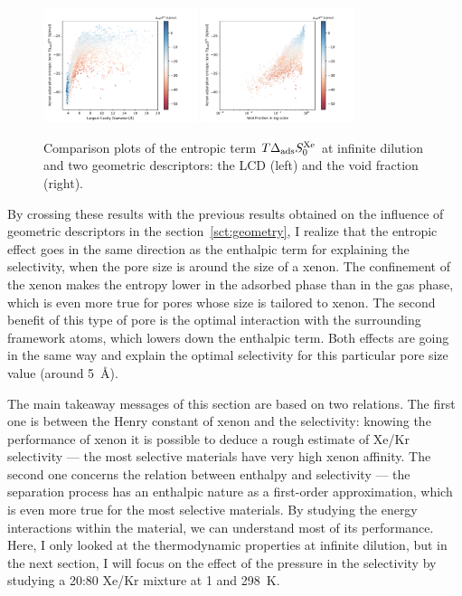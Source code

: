 \documentclass[main.tex]{subfiles}
\begin{document}
\begin{figure}
  \centering
  \includegraphics[width=0.4\textwidth]{figures/2-thermo/Scatterplot_entropy_lcd.pdf}
  \includegraphics[width=0.4\textwidth]{figures/2-thermo/Scatterplot_entropy_vf.pdf}
  \caption{Comparison plots of the entropic term $T\Delta_{\text{ads}}S^{\text{Xe}}_{\text{0}}$ at infinite dilution and two geometric descriptors: the LCD (left) and the void fraction (right).}\label{fgr:entropy_geometry}
\end{figure}

By crossing these results with the previous results obtained on the influence of geometric descriptors in the section~\ref{sct:geometry}, I realize that the entropic effect goes in the same direction as the enthalpic term for explaining the selectivity, when the pore size is around the size of a xenon. The confinement of the xenon makes the entropy lower in the adsorbed phase than in the gas phase, which is even more true for pores whose size is tailored to xenon. The second benefit of this type of pore is the optimal interaction with the surrounding framework atoms, which lowers down the enthalpic term. Both effects are going in the same way and explain the optimal selectivity for this particular pore size value (around \SI{5}{\angstrom}). 

The main takeaway messages of this section are based on two relations. The first one is between the Henry constant of xenon and the selectivity: knowing the performance of xenon it is possible to deduce a rough estimate of Xe/Kr selectivity --- the most selective materials have very high xenon affinity. The second one concerns the relation between enthalpy and selectivity --- the separation process has an enthalpic nature as a first-order approximation, which is even more true for the most selective materials. By studying the energy interactions within the material, we can understand most of its performance. Here, I only looked at the thermodynamic properties at infinite dilution, but in the next section, I will focus on the effect of the pressure in the selectivity by studying a 20:80 Xe/Kr mixture at \SI{1}{\atm} and \SI{298}{\kelvin}. 
\end{document}

